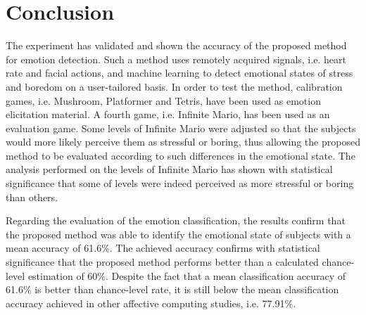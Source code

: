 


\section{Conclusion}

The experiment has validated and shown the accuracy of the proposed method for emotion detection. Such a method uses remotely acquired signals, i.e. heart rate and facial actions, and machine learning to detect emotional states of stress and boredom on a user-tailored basis. In order to test the method, calibration games, i.e. Mushroom, Platformer and Tetris, have been used as emotion elicitation material. A fourth game, i.e. Infinite Mario, has been used as an evaluation game. Some levels of Infinite Mario were adjusted so that the subjects would more likely perceive them as stressful or boring, thus allowing the proposed method to be evaluated according to such differences in the emotional state. The analysis performed on the levels of Infinite Mario has shown with statistical significance that some of levels were indeed perceived as more stressful or boring than others.

Regarding the evaluation of the emotion classification, the results confirm that the proposed method was able to identify the emotional state of subjects with a mean accuracy of 61.6\%. The achieved accuracy confirms with statistical significance that the proposed method performs better than a calculated chance-level estimation of 60\%. Despite the fact that a mean classification accuracy of 61.6\% is better than chance-level rate, it is still below the mean classification accuracy achieved in other affective computing studies, i.e. 77.91\%.


